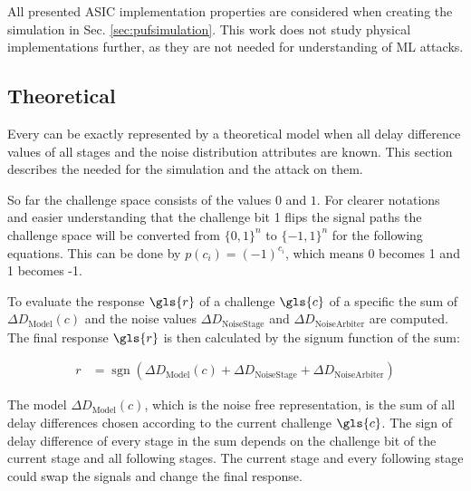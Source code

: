 All presented \apuf \ac{ASIC} implementation properties are considered when creating the \apuf simulation in Sec. \ref{sec:pufsimulation}.
This work does not study physical \apuf implementations further, as they are not needed for understanding of \ac{ML} attacks.


\subsection{Theoretical}
\label{sec:theoretical}

Every \apuf can be exactly represented by a theoretical model when all delay difference values of all stages and the noise distribution attributes are known.
This section describes the \apufs needed for the simulation and the attack on them.

So far the challenge space consists of the values $0$ and $1$.
For clearer notations and easier understanding that the challenge bit 1 flips the signal paths the challenge space will be converted from $\{0, 1\}^n$ to $\{-1, 1\}^n$ for the following equations.
This can be done by $p(c_i) = (-1)^{c_i}$, which means 0 becomes 1 and 1 becomes -1.

To evaluate the response $\gls{r}$ of a challenge $\gls{c}$ of a specific \puf the sum of $\Delta D_{\mathrm{Model}}(c)$ and the noise values $\Delta D_{\mathrm{Noise Stage}}$ and $\Delta D_{\mathrm{Noise Arbiter}}$ are computed.
The final response $\gls{r}$ is then calculated by the signum function of the sum:

\begin{align}
r &= \operatorname{sgn}(\Delta D_{\mathrm{Model}}(c) + \Delta D_{\mathrm{Noise Stage}} + \Delta D_{\mathrm{Noise Arbiter}}) \label{equ:pufresponse}
\end{align}

The model $\Delta D_{\mathrm{Model}}(c)$, which is the noise free \apuf representation, is the sum of all delay differences chosen according to the current challenge $\gls{c}$.
The sign of delay difference of every stage in the sum depends on the challenge bit of the current stage and all following stages. %
The current stage and every following stage could swap the signals and change the final response.

